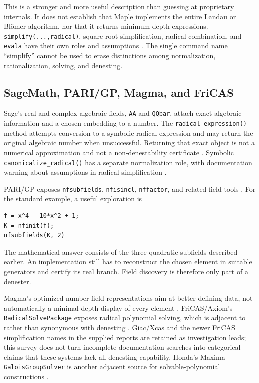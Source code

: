 \documentclass[11pt,a4paper]{article}
\numberwithin{equation}{section}
\theoremstyle{definition}\newtheorem{definition}[theorem]{Definition}
\theoremstyle{remark}\newtheorem{remark}[theorem]{Remark}
\begin{document}
This is a stronger and more useful description than guessing at proprietary internals. It does not establish that Maple implements the entire Landau or Bl\"omer algorithm, nor that it returns minimum-depth expressions. \texttt{simplify(...,radical)}, square-root simplification, radical combination, and \texttt{evala} have their own roles and assumptions \cite{maplesimp}. The single command name ``simplify'' cannot be used to erase distinctions among normalization, rationalization, solving, and denesting.

\subsection{SageMath, PARI/GP, Magma, and FriCAS}
Sage's real and complex algebraic fields, \texttt{AA} and \texttt{QQbar}, attach exact algebraic information and a chosen embedding to a number. The \texttt{radical\_expression()} method attempts conversion to a symbolic radical expression and may return the original algebraic number when unsuccessful. Returning that exact object is not a numerical approximation and not a non-denestability certificate \cite{sageaa}. Symbolic \texttt{canonicalize\_radical()} has a separate normalization role, with documentation warning about assumptions in radical simplification \cite{sagesymbolic}.

PARI/GP exposes \texttt{nfsubfields}, \texttt{nfisincl}, \texttt{nffactor}, and related field tools \cite{pari}. For the standard example, a useful exploration is
\begin{lstlisting}
f = x^4 - 10*x^2 + 1;
K = nfinit(f);
nfsubfields(K, 2)
\end{lstlisting}
The mathematical answer consists of the three quadratic subfields described earlier. An implementation still has to reconstruct the chosen element in suitable generators and certify its real branch. Field discovery is therefore only part of a denester.

Magma's optimized number-field representations aim at better defining data, not automatically a minimal-depth display of every element \cite{magma}. FriCAS/Axiom's \texttt{RadicalSolvePackage} exposes radical polynomial solving, which is adjacent to rather than synonymous with denesting \cite{fricas}. Giac/Xcas and the newer FriCAS simplification names in the supplied reports are retained as investigation leads; this survey does not turn incomplete documentation searches into categorical claims that these systems lack all denesting capability. Honda's Maxima \texttt{GaloisGroupSolver} is another adjacent source for solvable-polynomial constructions \cite{honda}.
\end{document}
